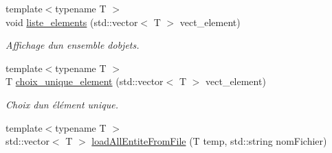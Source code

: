 \begin{DoxyCompactItemize}
{\footnotesize template$<$typename T $>$ }\\void \hyperlink{namespaceio_acf5693654c155fd094993bf20ac39343}{liste\+\_\+elements} (std\+::vector$<$ T $>$ vect\+\_\+element)
\begin{DoxyCompactList}\small\item\em Affichage d\textquotesingle{}un ensemble d\textquotesingle{}objets. \end{DoxyCompactList}\item 
{\footnotesize template$<$typename T $>$ }\\T \hyperlink{namespaceio_a379c013a79ad2d343811725631472b20}{choix\+\_\+unique\+\_\+element} (std\+::vector$<$ T $>$ vect\+\_\+element)
\begin{DoxyCompactList}\small\item\em Choix d\textquotesingle{}un élément unique. \end{DoxyCompactList}\item 
{\footnotesize template$<$typename T $>$ }\\std\+::vector$<$ T $>$ \hyperlink{namespaceio_a97ddce5128c7df7d67966208e2c37c4c}{load\+All\+Entite\+From\+File} (T temp, std\+::string nom\+Fichier)
\end{DoxyCompactItemize}
